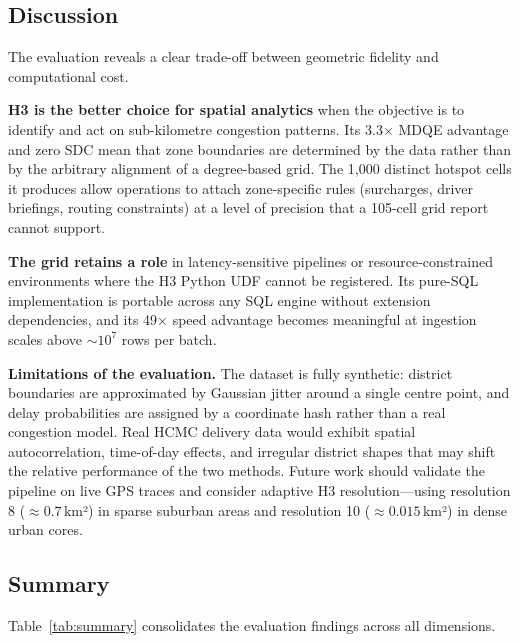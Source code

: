 
\subsection{Discussion}

The evaluation reveals a clear trade-off between geometric fidelity and
computational cost.

\textbf{H3 is the better choice for spatial analytics} when the objective is
to identify and act on sub-kilometre congestion patterns.
Its 3.3$\times$ MDQE advantage and zero SDC mean that zone boundaries are
determined by the data rather than by the arbitrary alignment of a
degree-based grid.
The 1{,}000 distinct hotspot cells it produces allow operations to attach
zone-specific rules (surcharges, driver briefings, routing constraints) at
a level of precision that a 105-cell grid report cannot support.

\textbf{The grid retains a role} in latency-sensitive pipelines or
resource-constrained environments where the H3 Python UDF cannot be
registered.
Its pure-SQL implementation is portable across any SQL engine without
extension dependencies, and its 49$\times$ speed advantage becomes meaningful
at ingestion scales above ${\sim}10^7$ rows per batch.

\textbf{Limitations of the evaluation.}
The dataset is fully synthetic: district boundaries are approximated by
Gaussian jitter around a single centre point, and delay probabilities are
assigned by a coordinate hash rather than a real congestion model.
Real HCMC delivery data would exhibit spatial autocorrelation, time-of-day
effects, and irregular district shapes that may shift the relative
performance of the two methods.
Future work should validate the pipeline on live GPS traces and consider
adaptive H3 resolution—using resolution 8 (${\approx}0.7$\,km²) in sparse
suburban areas and resolution 10 (${\approx}0.015$\,km²) in dense urban cores.


\subsection{Summary}

Table~\ref{tab:summary} consolidates the evaluation findings across all
dimensions.

